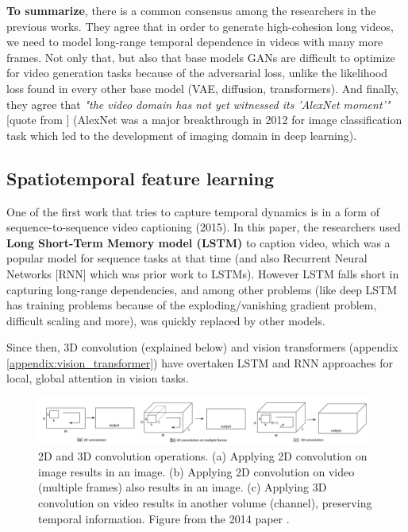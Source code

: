 \textbf{To summarize}, there is a common consensus among the researchers in the previous works. They agree that in order to generate high-cohesion long videos, we need to model long-range temporal dependence in videos with many more frames. Not only that, but also that base models GANs are difficult to optimize for video generation tasks because of the adversarial loss, unlike the likelihood loss found in every other base model (VAE, diffusion, transformers). And finally, they agree that \textit{"the video domain has not yet witnessed its 'AlexNet moment'"} [quote from \cite{tran2018closer}] (AlexNet \cite{alexnet} was a major breakthrough in 2012 for image classification task which led to the development of imaging domain in deep learning). 






\subsection{Spatiotemporal feature learning}

One of the first work that tries to capture temporal dynamics is in a form of sequence-to-sequence video captioning \cite{venugopalan2015sequence} (2015). In this paper, the researchers used \textbf{Long Short-Term Memory model (LSTM)} to caption video, which was a popular model for sequence tasks at that time (and also Recurrent Neural Networks [RNN] which was prior work to LSTMs). However LSTM falls short in capturing long-range dependencies, and among other problems (like deep LSTM has training problems because of the exploding/vanishing gradient problem, difficult scaling and more), was quickly replaced by other models.

Since then, 3D convolution (explained below) and vision transformers (appendix \ref{appendix:vision_transformer}) have overtaken LSTM and RNN approaches for local, global attention in vision tasks.

\begin{figure}
    \centering
    \includegraphics[width=1\textwidth]{images/video_synthesis/conv.png}
    \caption{2D and 3D convolution operations. (a) Applying 2D convolution on image results in an image. (b) Applying 2D convolution on video (multiple frames) also results in an image. (c) Applying 3D convolution on video results in another volume (channel), preserving temporal information. Figure from the 2014 paper \cite{tran2015learning}.}
\end{figure}


